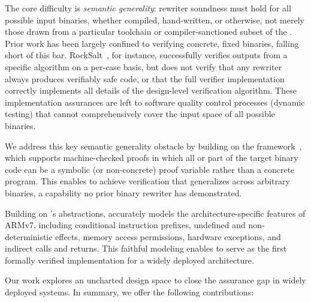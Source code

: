The core difficulty is \emph{semantic generality}: rewriter soundness must hold for all possible input binaries, whether compiled, hand-written, or otherwise, not merely those drawn from a particular toolchain or compiler-sanctioned subset of the \isa.
%
Prior work has been largely confined to verifying concrete, fixed binaries, falling short of this bar. RockSalt~\cite{rocksalt}, for instance, successfully verifies outputs from a specific \sfi algorithm on a per-case basis, but does not verify that any \sfi rewriter always produces verifiably safe code, or that the full verifier implementation correctly implements all details of the design-level verification algorithm.
%
These implementation assurances are left to software quality control processes (\eg dynamic testing) that cannot comprehensively cover the input space of all possible binaries.


We address this key semantic generality obstacle by building on the \Picinae{} framework~\cite{hamlen19feast,averill26bar}, which supports machine-checked proofs in which all or part of the target binary code can be a symbolic (or non-concrete) proof variable rather than a concrete program. This enables \pname to achieve verification that generalizes across arbitrary binaries, a capability no prior binary \cfi rewriter has demonstrated.

Building on \Picinae's \isa{} abstractions, \pname accurately models the architecture-specific features of ARMv7, including conditional instruction prefixes, undefined and non-deterministic effects, memory access permissions, hardware exceptions, and indirect calls and returns. This faithful modeling enables \pname to serve as the first formally verified \cfi implementation for a widely deployed architecture.

Our work explores an uncharted design space to close the assurance gap in widely deployed \cfi systems.
In summary, we offer the following contributions:

